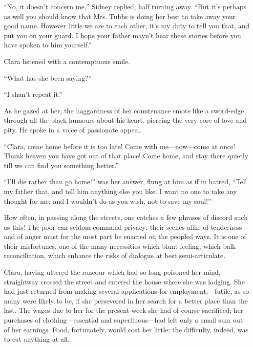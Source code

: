 ``No, it doesn't concern me,'' Sidney replied, half turning away. ``But
it's perhaps as well you should know that Mrs. Tubbs is doing her best
to take away your good name. However little we are to each other, it's
my duty to tell you that, and put you on your guard. I hope your father
mayn't hear these stories before you have spoken to him yourself.''

Clara listened with a contemptuous smile.

``What has she been saying?''

``I shan't repeat it.''

{}As he gazed at her, the haggardness of her countenance smote like a
sword-edge through all the black humours about his heart, piercing the
very core of love and pity. He spoke in a voice of passionate appeal.

``Clara, come home before it is too late! Come with me---now---come at
once! Thank heaven you have got out of that place! Come home, and stay
there quietly till we can find you something better.''

``I'll die rather than go home!'' was her answer, flung at him as if in
hatred, ``Tell my father that, and tell him anything else you like. I
want no one to take any thought for me; and I wouldn't do as you wish,
not to save my soul!''

How often, in passing along the streets, one catches a few phrases of
discord such as this! The poor can seldom command privacy; their scenes
alike of tenderness and of anger must for the most part be enacted on
the peopled ways. It is one of their misfortunes, one of the many
necessities which blunt feeling, which balk reconciliation, {}which
enhance the risks of dialogue at best semi-articulate.

Clara, having uttered the rancour which had so long poisoned her mind,
straightway crossed the street and entered the house where she was
lodging. She had just returned from making several applications for
employment,---futile, as so many were likely to be, if she persevered in
her search for a better place than the last. The wages due to her for
the present week she had of course sacrificed; her purchases of
clothing---essential and superfluous---had left only a small sum out of
her earnings. Food, fortunately, would cost her little; the difficulty,
indeed, was to eat anything at all.

